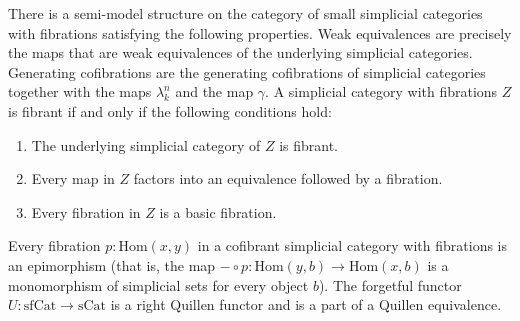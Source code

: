 \documentclass[reqno]{amsart}
\theoremstyle{definition}
\theoremstyle{remark}
\newcommand{\fs}[1]{\mathrm{#1}}
\newcommand{\Hom}{\fs{Hom}}
\newcommand{\sCat}{\fs{sCat}}
\newcommand{\sfCat}{\fs{sfCat}}
\numberwithin{figure}{section}
\begin{document}
\begin{prop}
There is a semi-model structure on the category of small simplicial categories with fibrations satisfying the following properties.
Weak equivalences are precisely the maps that are weak equivalences of the underlying simplicial categories.
Generating cofibrations are the generating cofibrations of simplicial categories together with the maps $\lambda^n_k$ and the map $\gamma$.
A simplicial category with fibrations $Z$ is fibrant if and only if the following conditions hold:
\begin{enumerate}
\item \label{it:fib-a} The underlying simplicial category of $Z$ is fibrant.
\item \label{it:fib-b} Every map in $Z$ factors into an equivalence followed by a fibration.
\item \label{it:fib-c} Every fibration in $Z$ is a basic fibration.
\end{enumerate}
Every fibration $p : \Hom(x,y)$ in a cofibrant simplicial category with fibrations is an epimorphism (that is, the map $- \circ p : \Hom(y,b) \to \Hom(x,b)$ is a monomorphism of simplicial sets for every object $b$).
The forgetful functor $U : \sfCat \to \sCat$ is a right Quillen functor and is a part of a Quillen equivalence.
\end{prop}
\end{document}
